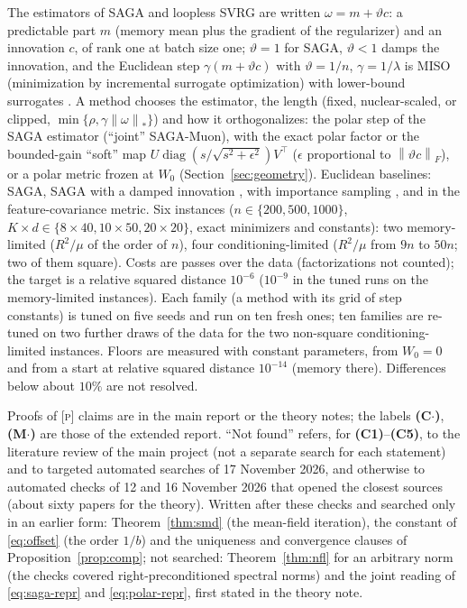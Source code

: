 \documentclass[10pt]{article}
\makeatletter
\renewcommand\subsection{\@startsection{subsection}{2}{\z@}{-1.8ex\@plus -0.5ex \@minus -.2ex}{0.8ex \@plus .2ex}{\normalfont\normalsize\bfseries}}
\theoremstyle{remark}
\newcommand{\nnuc}[1]{\left\|#1\right\|_{*}}
\newcommand{\nF}[1]{\left\|#1\right\|_{F}}
\newcommand{\diag}{\operatorname{diag}}
\newcommand{\finding}[1]{\textbf{(#1)}}
\newcommand{\nat}[1]{\textsc{[#1]}}
\makeatother
\begin{document}
The estimators of SAGA and loopless SVRG \cite{kovalev2020dont} are written $\omega=m+\vartheta c$: a predictable part $m$ (memory mean plus
the gradient of the regularizer) and an innovation $c$, of rank one at batch size one; $\vartheta=1$ for SAGA,
$\vartheta<1$ damps the innovation, and the Euclidean step $\gamma(m+\vartheta c)$ with $\vartheta=1/n$,
$\gamma=1/\lambda$ is MISO (minimization by incremental surrogate optimization) with lower-bound surrogates
\cite{mairal2015incremental}. A method chooses the estimator, the length (fixed, nuclear-scaled, or clipped,
$\min\{\rho,\gamma\nnuc\omega\}$) and how it orthogonalizes: the polar step of the SAGA estimator (``joint''
SAGA-Muon), with the exact polar factor or the bounded-gain ``soft'' map $U\diag(s/\sqrt{s^2+\epsilon^2})V^\top$
($\epsilon$ proportional to $\nF{\vartheta c}$), or a polar metric frozen at $W_0$ (Section~\ref{sec:geometry}).
Euclidean baselines: SAGA, SAGA with a damped innovation \cite{driggs2019biased}, with importance sampling
\cite{xiao2014proximal}, and in the feature-covariance metric. Six instances ($n\in\{200,500,1000\}$,
$K\times d\in\{8\times40,10\times50,20\times20\}$, exact minimizers and constants): two memory-limited ($R^2/\mu$ of the
order of $n$), four conditioning-limited ($R^2/\mu$ from $9n$ to $50n$; two of them square). Costs are passes over the
data (factorizations not counted); the target is a relative squared distance $10^{-6}$ ($10^{-9}$ in the tuned runs on
the memory-limited instances). Each family (a method with its grid of step constants) is tuned on five seeds and run
on ten fresh ones; ten families are re-tuned on two further draws of the data for the two non-square
conditioning-limited instances. Floors are measured with constant parameters, from $W_0=0$ and from a start at relative
squared distance $10^{-14}$ (memory there). Differences below about $10\%$ are not resolved.

\subsection{Status of the claims}\label{sec:status}

Proofs of \nat{p} claims are in the main report or the theory notes; the labels \finding{C$\cdot$}, \finding{M$\cdot$}
are those of the extended report. ``Not found'' refers, for \finding{C1}--\finding{C5}, to the
literature review of the main project (not a separate search for each statement) and to targeted automated searches of
17 November 2026, and otherwise to automated checks of 12 and 16 November 2026 that opened the closest sources (about
sixty papers for the theory). Written after these checks and searched only in an earlier form: Theorem~\ref{thm:smd}
(the mean-field iteration), the constant of \eqref{eq:offset} (the order $1/b$) and the uniqueness and convergence
clauses of Proposition~\ref{prop:comp}; not searched: Theorem~\ref{thm:nfl} for an arbitrary norm (the checks covered
right-preconditioned spectral norms) and the joint reading of \eqref{eq:saga-repr} and \eqref{eq:polar-repr}, first stated in the
theory note.
\end{document}
